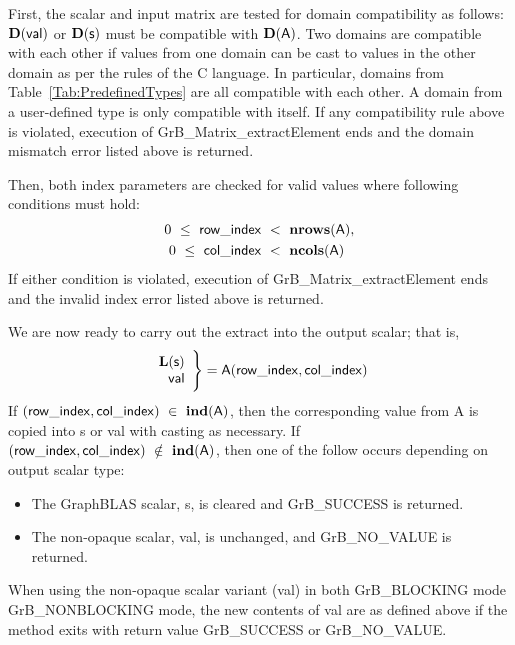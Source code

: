 First, the scalar and input matrix are tested for domain compatibility as follows:  
$\mathbf{D}({\sf val})$ or $\mathbf{D}({\sf s})$ must be compatible with $\mathbf{D}({\sf A})$. Two domains 
are compatible with each other if values from one domain can be cast to values 
in the other domain as per the rules of the C language.  In particular, domains 
from Table~\ref{Tab:PredefinedTypes} are all compatible with each other. A domain 
from a user-defined type is only compatible with itself.  If any compatibility 
rule above is violated, execution of {\sf GrB\_Matrix\_extractElement} ends and
the domain mismatch error listed above is returned.

Then, both index parameters are checked for valid values where following
conditions must hold:
\[
\begin{aligned}
    0\ \leq\ {\sf row\_index} & \ <\ \mathbf{nrows}({\sf A}), \\
    0\ \leq\ {\sf col\_index} & \ <\ \mathbf{ncols}({\sf A})
\end{aligned}
\]
If either condition is violated, execution of 
{\sf GrB\_Matrix\_extractElement} ends and the invalid 
index error listed above is returned. 

We are now ready to carry out the extract into the output scalar; that is,
\begin{align*}
  \begin{array}{r}
    \mathbf{L}({\sf s}) \\
    {\sf val} 
  \end{array}
  \Bigg\}  =  {\sf A}({\sf row\_index},{\sf col\_index})
\end{align*}
If $({\sf row\_index},{\sf col\_index}) \ \in \ \mathbf{ind}({\sf A})$, then the corresponding value from 
{\sf A} is copied into {\sf s} or {\sf val} with casting as necessary. If $({\sf row\_index},{\sf col\_index}) \ \notin \ \mathbf{ind}({\sf A})$, then one of the follow occurs depending on output scalar type: 
\begin{itemize}
\item The GraphBLAS scalar, {\sf s}, is cleared and {\sf GrB\_SUCCESS} is returned.
\item The non-opaque scalar, {\sf val}, is unchanged, and {\sf GrB\_NO\_VALUE} is returned. 
\end{itemize}

When using the non-opaque scalar variant ({\sf val}) in both {\sf GrB\_BLOCKING} mode 
{\sf GrB\_NONBLOCKING} mode, the new contents of {\sf val} are as defined above
if the method exits with return value {\sf GrB\_SUCCESS} or {\sf GrB\_NO\_VALUE}. 

